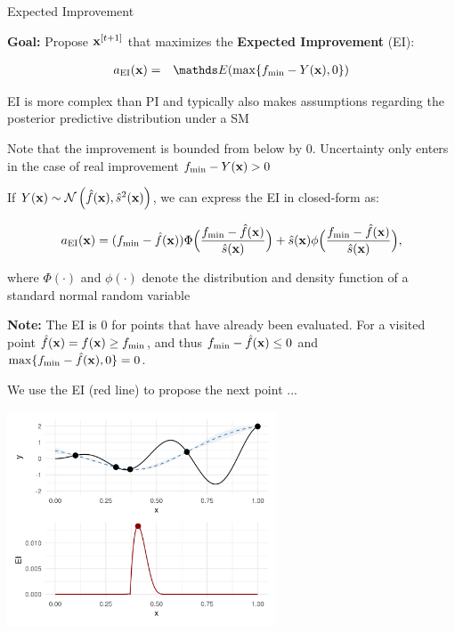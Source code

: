 \documentclass[11pt,compress,t,notes=noshow, xcolor=table]{beamer}
\begin{document}
\begin{vbframe}{Expected Improvement}

\textbf{Goal:} Propose $\mathbf{x}^{[t+1]}$ that maximizes the \textbf{Expected Improvement} (EI): 

\vspace*{-0.5cm}

\begin{eqnarray*}
  a_{\text{EI}}(\xv) &=& \E(\max\{\fmin - Y(\xv), 0\}) \\
\end{eqnarray*} 

\vspace*{-0.5cm}

EI is more complex than PI and typically also makes assumptions regarding the posterior predictive distribution under a SM\\

\vspace{1em}

Note that the improvement is bounded from below by $0$. Uncertainty only enters in the case of real improvement $f_{\min} - Y(\mathbf{x}) > 0$

\framebreak

If $Y(\mathbf{x}) \sim \mathcal{N}\left(\hat{f}(\mathbf{x}), \hat{s}^2(\mathbf{x})\right)$, we can express the EI in closed-form as: 

$$
a_{\text{EI}}(\mathbf{x}) = (f_{\min}-\hat{f}(\mathbf{x})) \Phi \Big(\frac{f_{\min} - \hat{f}(\mathbf{x})}{\hat{s}(\mathbf{x})}\Big) + \hat{s}(\mathbf{x}) \phi\Big(\frac{f_{\min}-\hat{f}(\mathbf{x})}{\hat{s}(\mathbf{x})}\Big), 
$$

where $\Phi(\cdot)$ and $\phi(\cdot)$ denote the distribution and density function of a standard normal random variable

\vfill

\begin{footnotesize}
\textbf{Note:} The EI is $0$ for points that have already been evaluated. For a visited point $\hat{f}(\mathbf{x}) = f(\mathbf{x}) \ge f_{\min}$, and thus $f_{\min} - \hat{f}(\mathbf{x}) \le 0$ and $\max\{f_{\min} - \hat{f}(\mathbf{x}), 0\} = 0$.
\end{footnotesize}

\framebreak

We use the EI (red line) to propose the next point ...

\begin{center}
  \includegraphics[width = 0.6\textwidth]{figure_man/bayesian_loop_1.png}
\end{center}


\end{vbframe}
\end{document}
